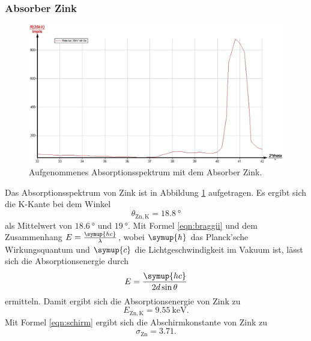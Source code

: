 \subsubsection{Absorber Zink}
\begin{figure}
	\centering
	\includegraphics[width=1.0\textwidth]{nIKO_und_jULIAN_ÜLADS/zink.jpg}
	\caption{Aufgenommenes Absorptionsspektrum mit dem Absorber Zink.}
	\label{fig:zink_absorber}
\end{figure}
Das Absorptionsspektrum von Zink ist in Abbildung \ref{fig:zink_absorber} aufgetragen.
Es ergibt sich die K-Kante bei dem Winkel
\begin{equation*}
	\theta_{\mathrm{Zn,K}} = \SI{18.8}{\degree}
\end{equation*}
als Mittelwert von $\SI{18.6}{\degree}$ und $\SI{19}{\degree}$.
Mit Formel \eqref{eqn:braggii} und dem Zusammenhang $E = \frac{\symup{hc}}{\lambda}$,
wobei $\symup{h}$
das Planck'sche Wirkungsquantum und $\symup{c}$ die Lichtgeschwindigkeit im Vakuum ist, lässt
sich die Absorptionsenergie durch
\begin{equation}
	\label{eqn:Absorptionsenergie}
	E = \frac{\symup{hc}}{2d\sin\theta}
\end{equation}
ermitteln.
Damit ergibt sich die Absorptionsenergie von Zink zu
\begin{equation*}
	E_{\mathrm{Zn,K}} = \SI{9.55}{\kilo\electronvolt} \mathrm{.}
\end{equation*}
Mit Formel \eqref{eqn:schirm} ergibt sich die Abschirmkonstante von Zink zu
\begin{equation*}
	\sigma_{\mathrm{Zn}} = \num{3.71} \mathrm{.}
\end{equation*}

\FloatBarrier

